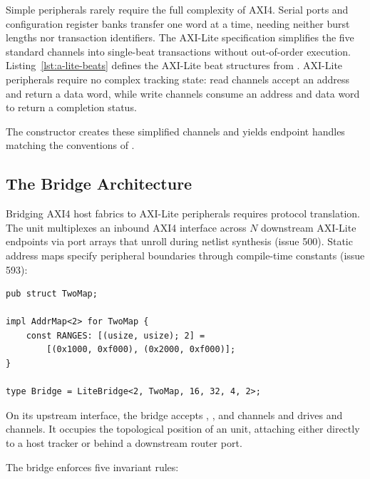 \documentclass[journal,9pt]{IEEEtran}
\begin{document}
Simple peripherals rarely require the full complexity of AXI4. Serial ports
and configuration register banks transfer one word at a time, needing neither
burst lengths nor transaction identifiers. The AXI-Lite specification
simplifies the five standard channels into single-beat transactions without
out-of-order execution. Listing~\ref{lst:a-lite-beats} defines the AXI-Lite
beat structures from . AXI-Lite peripherals require no
complex tracking state: read channels accept an address and return a data
word, while write channels consume an address and data word to return a
completion status.



The constructor  creates these simplified channels and
yields endpoint handles matching the conventions of .

\subsection*{The Bridge Architecture}

Bridging AXI4 host fabrics to AXI-Lite peripherals requires protocol
translation. The  unit multiplexes an inbound AXI4 interface
across \(N\) downstream AXI-Lite endpoints via port arrays that unroll during
netlist synthesis (issue 500). Static address maps specify peripheral
boundaries through compile-time constants (issue 593):

\begin{lstlisting}
pub struct TwoMap;

impl AddrMap<2> for TwoMap {
    const RANGES: [(usize, usize); 2] =
        [(0x1000, 0xf000), (0x2000, 0xf000)];
}

type Bridge = LiteBridge<2, TwoMap, 16, 32, 4, 2>;
\end{lstlisting}

On its upstream interface, the bridge accepts , , and
 channels and drives  and  channels. It occupies the
topological position of an  unit, attaching either directly to a
host tracker or behind a downstream router port.

The bridge enforces five invariant rules:
\end{document}
